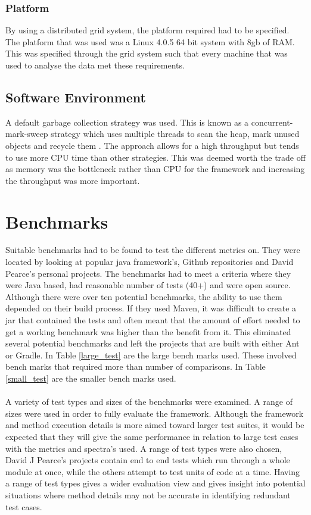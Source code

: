 \subsubsection{Platform}

By using a distributed grid system, the platform required had to be specified. The platform that was used was a Linux 4.0.5 64 bit system with 8gb of RAM. This was specified through the grid system such that every machine that was used to analyse the data met these requirements.

\subsection{Software Environment}

A default garbage collection strategy was used. This is known as a concurrent-mark-sweep strategy which uses multiple threads to scan the heap, mark unused objects and recycle them \cite{oracle2015}. The approach allows for a high throughput but tends to use more CPU time than other strategies. This was deemed worth the trade off as memory was the bottleneck rather than CPU for the framework and increasing the throughput was more important.

\section{Benchmarks}
\label{S:bench}
Suitable benchmarks had to be found to test the different metrics on. They were located by looking at popular java framework's, Github repositories and David Pearce's personal projects. The benchmarks had to meet a criteria where they were Java based, had reasonable number of tests (40+) and were open source. Although there were over ten potential benchmarks, the ability to use them depended on their build process. If they used Maven, it was difficult to create a jar that contained the tests and often meant that the amount of effort needed to get a working benchmark was higher than the benefit from it. This eliminated several potential benchmarks and left the projects that are built with either Ant or Gradle. In Table \ref{large_test} are the large bench marks used. These involved bench marks that required more than  number of comparisons. In Table \ref{small_test} are the smaller bench marks used. 
\paragraph{}
A variety of test types and sizes of the benchmarks were examined. A range of sizes were used in order to fully evaluate the framework. Although the framework and method execution details is more aimed toward larger test suites, it would be expected that they will give the same performance in relation to large test cases with the metrics and spectra's used. A range of test types were also chosen, David J Pearce's projects contain end to end tests which run through a whole module at once, while the others attempt to test units of code at a time. Having a range of test types gives a wider evaluation view and gives insight into potential situations where method details may not be accurate in identifying redundant test cases.
